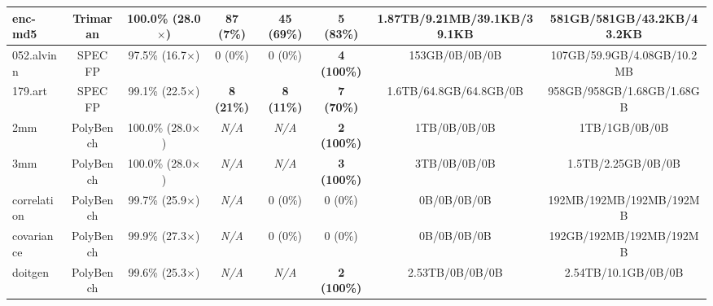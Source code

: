 {\begin{tabular}{|l|c|c||c|c||c|c|c|}
\hline
enc-md5    & Trimaran & 100.0\% (28.0$\times$) & \textbf{87 (7\%)} & \textbf{45 (69\%)} & \textbf{5 (83\%)} &
           1.87TB/9.21MB/39.1KB/39.1KB & 581GB/581GB/43.2KB/43.2KB \\ %
\hline
052.alvinn & SPEC FP  & 97.5\% (16.7$\times$) & 0 (0\%) & 0 (0\%) & \textbf{4 (100\%)} &
           153GB/0B/0B/0B & 107GB/59.9GB/4.08GB/10.2MB \\  %
\hline
179.art    & SPEC FP  & 99.1\% (22.5$\times$) & \textbf{8 (21\%)} & \textbf{8 (11\%)} & \textbf{7 (70\%)} &
           1.6TB/64.8GB/64.8GB/0B & 958GB/958GB/1.68GB/1.68GB \\ %
\hline
2mm        & PolyBench & 100.0\% (28.0$\times$)  & \textit{N/A} & \textit{N/A} & \textbf{2 (100\%)} &
           1TB/0B/0B/0B & 1TB/1GB/0B/0B \\ %
\hline
3mm        & PolyBench & 100.0\% (28.0$\times$)  & \textit{N/A} & \textit{N/A} & \textbf{3 (100\%)} &
           3TB/0B/0B/0B & 1.5TB/2.25GB/0B/0B \\ %
\hline
correlation & PolyBench & 99.7\% (25.9$\times$) & \textit{N/A} & 0 (0\%)  & 0 (0\%) &
            0B/0B/0B/0B & 192MB/192MB/192MB/192MB \\ %
\hline
covariance & PolyBench & 99.9\% (27.3$\times$) & \textit{N/A} & 0 (0\%) & 0 (0\%) &
           0B/0B/0B/0B & 192GB/192MB/192MB/192MB \\ %
\hline
doitgen   & PolyBench & 99.6\% (25.3$\times$) & \textit{N/A} & \textit{N/A} & \textbf{2 (100\%)} &
          2.53TB/0B/0B/0B & 2.54TB/10.1GB/0B/0B \\ %

\end{tabular}}
